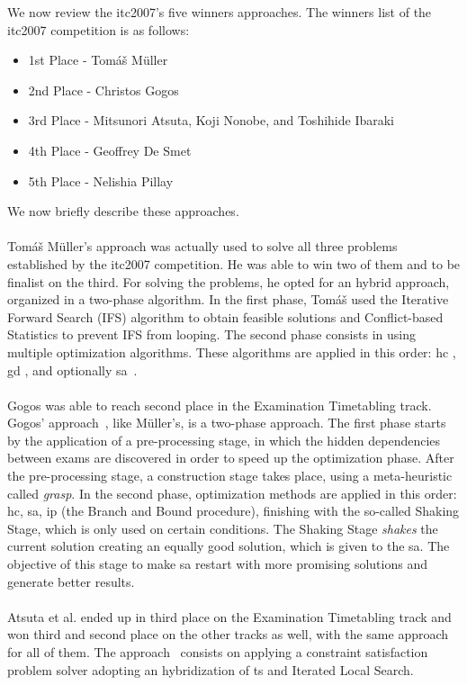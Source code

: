 We now review the \gls{itc2007}'s five winners approaches. The winners list of the \gls{itc2007} competition is as follows:
\begin{itemize}
	\item 1st Place - Tom\'{a}\v{s} M\"{u}ller
	\item 2nd Place - Christos Gogos
	\item 3rd Place - Mitsunori Atsuta, Koji Nonobe, and Toshihide Ibaraki
	\item 4th Place - Geoffrey De Smet
	\item 5th Place - Nelishia Pillay
\end{itemize}
We now briefly describe these approaches.\\
\\
Tom\'{a}\v{s} M\"{u}ller's approach \cite{Mueller2009} was actually used to solve all three problems established by the \gls{itc2007} competition. He was able to win two of them and to be finalist on the third. For solving the problems, he opted for an hybrid approach, organized in a two-phase algorithm. In the first phase, Tom\'{a}\v{s} used the Iterative Forward Search (IFS) algorithm \cite{Mueller2005} to obtain feasible solutions and Conflict-based Statistics \cite{Mueller2004} to prevent IFS from looping. The second phase consists in using multiple optimization algorithms. These algorithms are applied in this order: \gls{hc} \cite{Russell2010}, \gls{gd} \cite{Dueck1993}, and optionally \gls{sa}~\cite{Kirkpatrick1983}.\\
\\
Gogos was able to reach second place in the Examination Timetabling track. Gogos' approach~\cite{Gogos2012}, like M\"{u}ller's, is a two-phase approach. The first phase starts by the application of a pre-processing stage, in which the hidden dependencies between exams are discovered in order to speed up the optimization phase. After the pre-processing stage, a construction stage takes place, using a meta-heuristic called \textit{\gls{grasp}}. In the second phase, optimization methods are applied in this order: \gls{hc}, \gls{sa}, \gls{ip} (the Branch and Bound procedure), finishing with the so-called Shaking Stage, which is only used on certain conditions. The Shaking Stage \textit{shakes} the current solution creating an equally good solution, which is given to the \gls{sa}. The objective of this stage to make \gls{sa} restart with more promising solutions and generate better results.\\
\\
Atsuta et al. ended up in third place on the Examination Timetabling track and won third and second place on the other tracks as well, with the same approach for all of them. The approach~\cite{Atsuta2007} consists on applying a constraint satisfaction problem solver adopting an hybridization of \gls{ts} and Iterated Local Search.\\
